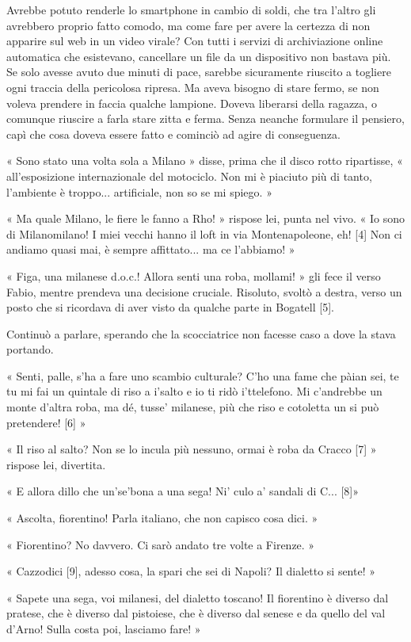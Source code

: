 Avrebbe potuto renderle lo smartphone in cambio di soldi, che tra l'altro gli avrebbero proprio fatto comodo, ma come fare per avere la certezza di non apparire sul web in un video virale? Con tutti i servizi di archiviazione online automatica che esistevano, cancellare un file da un dispositivo non bastava più. Se solo avesse avuto due minuti di pace, sarebbe sicuramente riuscito a togliere ogni traccia della pericolosa ripresa. Ma aveva bisogno di stare fermo, se non voleva prendere in faccia qualche lampione. Doveva liberarsi della ragazza, o comunque riuscire a farla stare zitta e ferma. Senza neanche formulare il pensiero, capì che cosa doveva essere fatto e cominciò ad agire di conseguenza.

« Sono stato una volta sola a Milano » disse, prima che il disco rotto ripartisse, « all'esposizione internazionale del motociclo. Non mi è piaciuto più di tanto, l'ambiente è troppo... artificiale, non so se mi spiego. »

« Ma quale Milano, le fiere le fanno a Rho! » rispose lei, punta nel vivo. « Io sono di Milanomilano! I miei vecchi hanno il loft in via Montenapoleone, eh! [4] Non ci andiamo quasi mai, è sempre affittato... ma ce l'abbiamo! »

« Figa, una milanese d.o.c.! Allora senti una roba, mollami! » gli fece il verso Fabio, mentre prendeva una decisione cruciale. Risoluto, svoltò a destra, verso un posto che si ricordava di aver visto da qualche parte in Bogatell [5].

Continuò a parlare, sperando che la scocciatrice non facesse caso a dove la stava portando.

« Senti, palle, s'ha a fare uno scambio culturale? C'ho una fame che pàian sei, te tu mi fai un quintale di riso a i'salto e io ti ridò i'ttelefono. Mi c'andrebbe un monte d'altra roba, ma dé, tusse' milanese, più che riso e cotoletta un si può pretendere! [6] »

« Il riso al salto? Non se lo incula più nessuno, ormai è roba da Cracco [7] » rispose lei, divertita.

« E allora dillo che un'se'bona a una sega! Ni' culo a' sandali di C... [8]»

« Ascolta, fiorentino! Parla italiano, che non capisco cosa dici. »

« Fiorentino? No davvero. Ci sarò andato tre volte a Firenze. »

« Cazzodici [9], adesso cosa, la spari che sei di Napoli? Il dialetto si sente! »

« Sapete una sega, voi milanesi, del dialetto toscano! Il fiorentino è diverso dal pratese, che è diverso dal pistoiese, che è diverso dal senese e da quello del val d'Arno! Sulla costa poi, lasciamo fare! »

